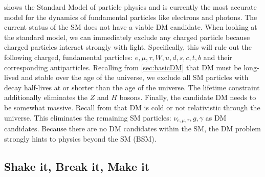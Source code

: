  shows the Standard Model of particle physics and is currently the most accurate model for the dynamics of fundamental particles like electrons and photons.
The current status of the SM does not have a viable DM candidate.
When looking at the standard model, we can immediately exclude any charged particle because charged particles interact strongly with light.
Specifically, this will rule out the following charged, fundamental particles: $e,\mu, \tau, W, u, d, s, c, t, b$ and their corresponding antiparticles.
Recalling from \cref{sec:basicDM} that DM must be long-lived and stable over the age of the universe, we exclude all SM particles with decay half-lives at or shorter than the age of the universe.
The lifetime constraint additionally eliminates the $Z$ and $H$ bosons.
Finally, the candidate DM needs to be somewhat massive.
Recall from  that DM is cold or not relativistic through the universe.
This eliminates the remaining SM particles: $\nu_{e, \mu, \tau}, g, \gamma$ as DM candidates.
Because there are no DM candidates within the SM, the DM problem strongly hints to physics beyond the SM (BSM).

\subsection{Shake it, Break it, Make it\label{sec:bop_it}}

\begin{figure}[h]
\end{figure}

